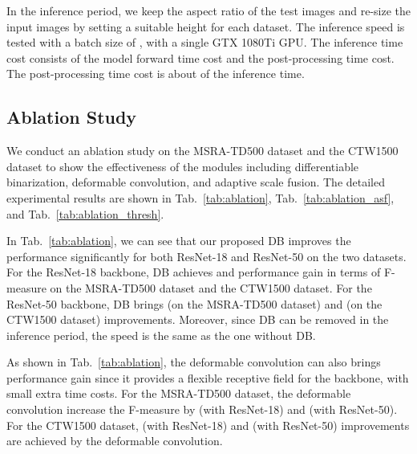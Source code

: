 In the inference period, we keep the aspect ratio of the test images and re-size the input images by setting a suitable height for each dataset. The inference speed is tested with a batch size of , with a single GTX 1080Ti GPU. The inference time cost consists of the model forward time cost and the post-processing time cost. The post-processing time cost is about  of the inference time.

\subsection{Ablation Study}
We conduct an ablation study on the MSRA-TD500 dataset and the CTW1500 dataset to show the effectiveness of the modules including differentiable binarization, deformable convolution, and adaptive scale fusion. The detailed experimental results are shown in Tab.~\ref{tab:ablation}, Tab.~\ref{tab:ablation_asf},  and Tab.~\ref{tab:ablation_thresh}.

In Tab.~\ref{tab:ablation}, we can see that our proposed DB improves the performance significantly for both ResNet-18 and ResNet-50 on the two datasets.
For the ResNet-18 backbone, DB achieves  and  performance gain in terms of F-measure on the MSRA-TD500 dataset and the CTW1500 dataset. For the ResNet-50 backbone, DB brings  (on the MSRA-TD500 dataset) and  (on the CTW1500 dataset) improvements. Moreover, since DB can be removed in the inference period, the speed is the same as the one without DB. 

As shown in Tab.~\ref{tab:ablation}, the deformable convolution can also brings  performance gain since it provides a flexible receptive field for the backbone, with small extra time costs. For the MSRA-TD500 dataset, the deformable convolution increase the F-measure by  (with ResNet-18) and  (with ResNet-50). For the CTW1500 dataset,  (with ResNet-18) and  (with ResNet-50) improvements are achieved by the deformable convolution.

